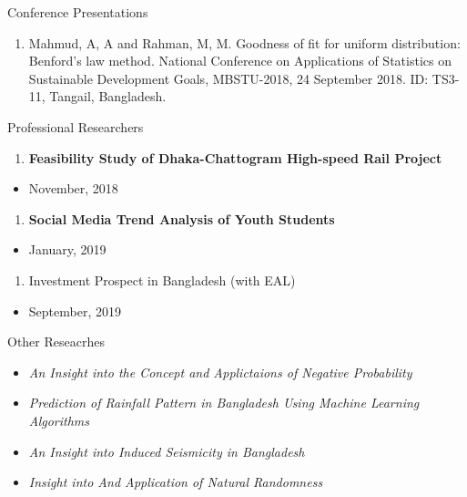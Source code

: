 \documentclass[
]{book}
\providecommand{\tightlist}{%
  \setlength{\itemsep}{0pt}\setlength{\parskip}{0pt}}
\begin{document}
Conference Presentations

\begin{enumerate}
\def\labelenumi{\arabic{enumi}.}
\tightlist
\item
  Mahmud, A, A and Rahman, M, M. Goodness of fit for uniform distribution:
  Benford's law method. National Conference on Applications of Statistics on
  Sustainable Development Goals, MBSTU-2018, 24 September 2018. ID: TS3-11,
  Tangail, Bangladesh.
\end{enumerate}

Professional Researchers

\begin{enumerate}
\def\labelenumi{\arabic{enumi}.}
\tightlist
\item
  \textbf{Feasibility Study of Dhaka-Chattogram High-speed Rail Project}
\end{enumerate}

\begin{itemize}
\tightlist
\item
  November, 2018
\end{itemize}

\begin{enumerate}
\def\labelenumi{\arabic{enumi}.}
\setcounter{enumi}{1}
\tightlist
\item
  \textbf{Social Media Trend Analysis of Youth Students}
\end{enumerate}

\begin{itemize}
\tightlist
\item
  January, 2019
\end{itemize}

\begin{enumerate}
\def\labelenumi{\arabic{enumi}.}
\setcounter{enumi}{2}
\tightlist
\item
  Investment Prospect in Bangladesh (with EAL)
\end{enumerate}

\begin{itemize}
\tightlist
\item
  September, 2019
\end{itemize}

Other Reseacrhes

\begin{itemize}
\tightlist
\item
  \emph{An Insight into the Concept and Applictaions of Negative Probability}
\item
  \emph{Prediction of Rainfall Pattern in Bangladesh Using Machine Learning Algorithms}
\item
  \emph{An Insight into Induced Seismicity in Bangladesh}
\item
  \emph{Insight into And Application of Natural Randomness}
\end{itemize}
\end{document}
